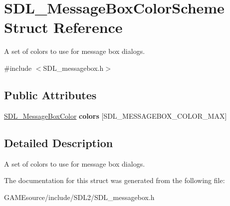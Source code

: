 \hypertarget{struct_s_d_l___message_box_color_scheme}{}\section{S\+D\+L\+\_\+\+Message\+Box\+Color\+Scheme Struct Reference}
\label{struct_s_d_l___message_box_color_scheme}


A set of colors to use for message box dialogs.  




{\ttfamily \#include $<$S\+D\+L\+\_\+messagebox.\+h$>$}

\subsection*{Public Attributes}
\begin{DoxyCompactItemize}
\item 
\mbox{\label{struct_s_d_l___message_box_color_scheme_ae3712ec81e41b63b781b7d49d3b3b8f6}} 
\mbox{\hyperlink{struct_s_d_l___message_box_color}{S\+D\+L\+\_\+\+Message\+Box\+Color}} {\bfseries colors} \mbox{[}S\+D\+L\+\_\+\+M\+E\+S\+S\+A\+G\+E\+B\+O\+X\+\_\+\+C\+O\+L\+O\+R\+\_\+\+M\+AX\mbox{]}
\end{DoxyCompactItemize}


\subsection{Detailed Description}
A set of colors to use for message box dialogs. 

The documentation for this struct was generated from the following file\+:\begin{DoxyCompactItemize}
\item 
G\+A\+M\+Esource/include/\+S\+D\+L2/S\+D\+L\+\_\+messagebox.\+h\end{DoxyCompactItemize}
